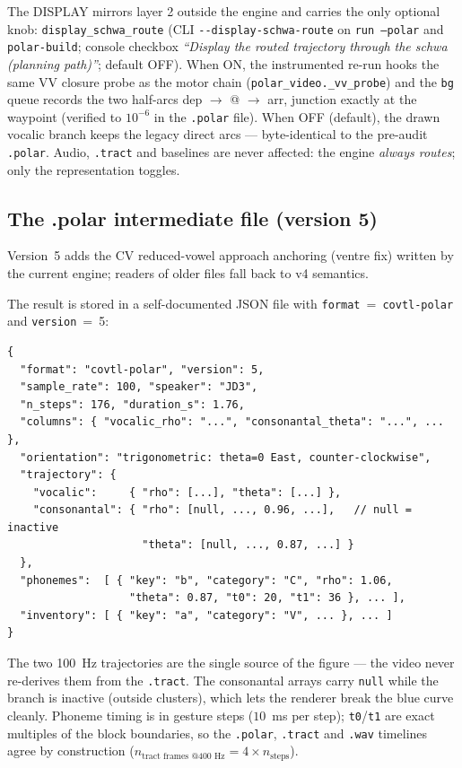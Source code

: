 \documentclass[11pt,a4paper]{article}
\newcommand{\code}[1]{\texttt{#1}}
\begin{document}
The DISPLAY mirrors layer 2 outside the engine and carries the only
optional knob: \code{display\_schwa\_route} (CLI
\code{-{}-display-schwa-route} on \code{run --polar} and
\code{polar-build}; console checkbox \emph{``Display the routed
trajectory through the schwa (planning path)''}; default OFF). When ON,
the instrumented re-run hooks the same VV closure probe as the motor
chain (\code{polar\_video.\_vv\_probe}) and the \code{bg} queue records
the two half-arcs dep $\to$ @ $\to$ arr, junction exactly at the
waypoint (verified to $10^{-6}$ in the \code{.polar} file). When OFF
(default), the drawn vocalic branch keeps the legacy direct arcs ---
byte-identical to the pre-audit \code{.polar}. Audio, \code{.tract}
and baselines are never affected: the engine \emph{always routes};
only the representation toggles.

\subsection{The .polar intermediate file (version 5)}

Version~5 adds the CV reduced-vowel approach anchoring (ventre fix) written by the current engine; readers of older files fall back to v4 semantics.

The result is stored in a self-documented JSON file with
\code{format}~=~\code{covtl-polar} and \code{version}~=~5:

\begin{lstlisting}[style=json]
{
  "format": "covtl-polar", "version": 5,
  "sample_rate": 100, "speaker": "JD3",
  "n_steps": 176, "duration_s": 1.76,
  "columns": { "vocalic_rho": "...", "consonantal_theta": "...", ... },
  "orientation": "trigonometric: theta=0 East, counter-clockwise",
  "trajectory": {
    "vocalic":     { "rho": [...], "theta": [...] },
    "consonantal": { "rho": [null, ..., 0.96, ...],   // null = inactive
                     "theta": [null, ..., 0.87, ...] }
  },
  "phonemes":  [ { "key": "b", "category": "C", "rho": 1.06,
                   "theta": 0.87, "t0": 20, "t1": 36 }, ... ],
  "inventory": [ { "key": "a", "category": "V", ... }, ... ]
}
\end{lstlisting}

The two 100~Hz trajectories are the single source of the figure ---
the video never re-derives them from the \code{.tract}. The
consonantal arrays carry \code{null} while the branch is inactive
(outside clusters), which lets the renderer break the blue curve
cleanly. Phoneme timing is in gesture steps ($10$~ms per step);
\code{t0}/\code{t1} are exact multiples of the block boundaries, so
the \code{.polar}, \code{.tract} and \code{.wav} timelines agree by
construction ($n_{\text{tract frames @400 Hz}} = 4 \times
n_{\text{steps}}$).
\end{document}

